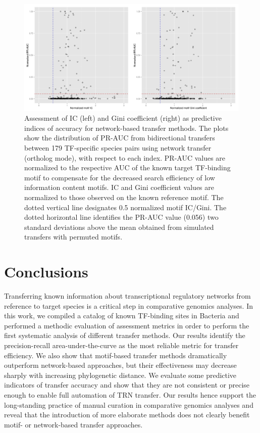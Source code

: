 \begin{figure}
  \centering
  \includegraphics[width=\textwidth]{figures/chapter3/ic-and-gini}
  \caption[Assessment of IC (left) and Gini coefficient (right) as predictive
  indices of accuracy for network-based transfer methods.]{Assessment of IC
    (left) and Gini coefficient (right) as predictive indices of accuracy for
    network-based transfer methods. The plots show the distribution of PR-AUC
    from bidirectional transfers between 179 TF-specific species pairs using
    network transfer (ortholog mode), with respect to each index. PR-AUC values
    are normalized to the respective AUC of the known target TF-binding motif
    to compensate for the decreased search efficiency of low information
    content motifs. IC and Gini coefficient values are normalized to those
    observed on the known reference motif. The dotted vertical line designates
    0.5 normalized motif IC/Gini. The dotted horizontal line identifies the
    PR-AUC value (0.056) two standard deviations above the mean obtained from
    simulated transfers with permuted motifs.  }
\label{fig:ic-and-gini}
\end{figure}

\section{Conclusions}

Transferring known information about transcriptional regulatory networks from
reference to target species is a critical step in comparative genomics
analyses. In this work, we compiled a catalog of known TF-binding sites in
Bacteria and performed a methodic evaluation of assessment metrics in order to
perform the first systematic analysis of different transfer methods. Our
results identify the precision-recall area-under-the-curve as the most reliable
metric for transfer efficiency. We also show that motif-based transfer methods
dramatically outperform network-based approaches, but their effectiveness may
decrease sharply with increasing phylogenetic distance. We evaluate some
predictive indicators of transfer accuracy and show that they are not
consistent or precise enough to enable full automation of TRN transfer. Our
results hence support the long-standing practice of manual curation in
comparative genomics analyses and reveal that the introduction of more
elaborate methods does not clearly benefit motif- or network-based transfer
approaches.

